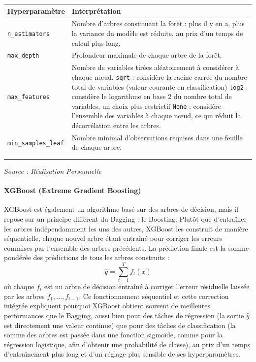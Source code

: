 \documentclass[a4paper,12pt, oneside]{article}
\begin{document}
\begin{longtable}{|m{5cm}|m{12cm}|}
\hline
\textbf{Hyperparamètre} & \textbf{Interprétation} \\
\hline
\texttt{n\_estimators} & Nombre d'arbres constituant la forêt : plus il y en a, plus la variance du modèle est réduite, au prix d'un temps de calcul plus long. \\
\hline
\texttt{max\_depth} & Profondeur maximale de chaque arbre de la forêt. \\
\hline
\texttt{max\_features} & Nombre de variables tirées aléatoirement à considérer à chaque nœud. \newline \texttt{sqrt} : considère la racine carrée du nombre total de variables (valeur courante en classification) \newline \texttt{log2} : considère le logarithme en base 2 du nombre total de variables, un choix plus restrictif \newline\texttt{None} : considère l'ensemble des variables à chaque nœud, ce qui réduit la décorrélation entre les arbres. \\
\hline
\texttt{min\_samples\_leaf} & Nombre minimal d'observations requises dans une feuille de chaque arbre. \\
\hline
\caption{Hyperparamètres -- Random Forest\\}
\end{longtable}
\begin{center}
\vspace{-0.85cm}
\textit{Source : Réalisation Personnelle}
\end{center}

\paragraph{XGBoost (Extreme Gradient Boosting)\\}
XGBoost est également un algorithme basé sur des arbres de décision, mais il repose sur un principe différent du Bagging : le Boosting. Plutôt que d'entraîner les arbres indépendamment les uns des autres, XGBoost les construit de manière séquentielle, chaque nouvel arbre étant entraîné pour corriger les erreurs commises par l'ensemble des arbres précédents. La prédiction finale est la somme pondérée des prédictions de tous les arbres construits :
\[
\hat{y} = \sum_{t=1}^{T} f_t(x)
\]
où chaque $f_t$ est un arbre de décision entraîné à corriger l'erreur résiduelle laissée par les arbres $f_1, \dots, f_{t-1}$. Ce fonctionnement séquentiel et cette correction intégrée expliquent pourquoi XGBoost obtient souvent de meilleures performances que le Bagging, aussi bien pour des tâches de régression (la sortie $\hat{y}$ est directement une valeur continue) que pour des tâches de classification (la somme des arbres est passée dans une fonction sigmoïde, comme pour la régression logistique, afin d'obtenir une probabilité de classe), au prix d'un temps d'entraînement plus long et d'un réglage plus sensible de ses hyperparamètres.
\end{document}
